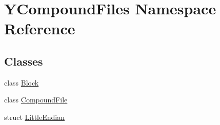 \hypertarget{namespace_y_compound_files}{}\section{Y\+Compound\+Files Namespace Reference}
\label{namespace_y_compound_files}
\subsection*{Classes}
\begin{DoxyCompactItemize}
\item 
class \hyperlink{class_y_compound_files_1_1_block}{Block}
\item 
class \hyperlink{class_y_compound_files_1_1_compound_file}{Compound\+File}
\item 
struct \hyperlink{struct_y_compound_files_1_1_little_endian}{Little\+Endian}
\end{DoxyCompactItemize}
